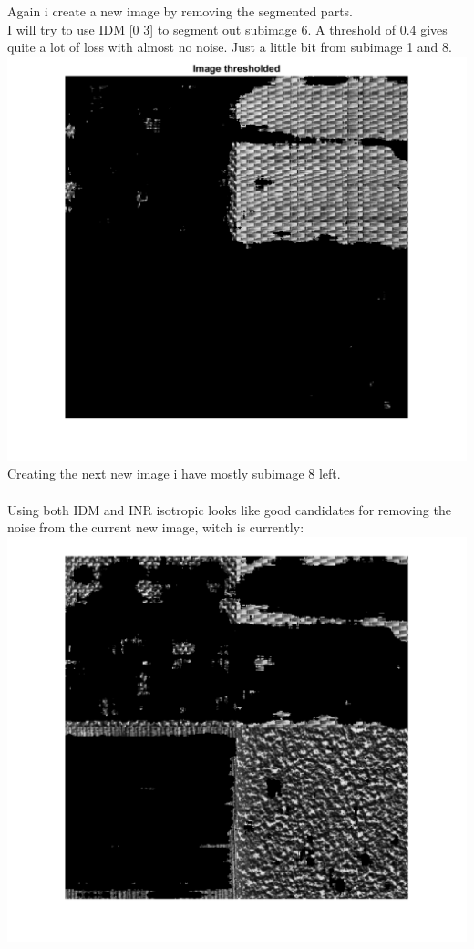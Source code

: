 \documentclass[12pt, letterpaper, twoside]{article}
\begin{document}
Again i create a new image by removing the segmented parts.
\newpage
\ \\
I will try to use IDM [0 3] to segment out subimage 6. A threshold of 0.4 gives quite a lot of loss with almost no noise. Just a little bit from subimage 1 and 8.\\
\includegraphics[scale=0.7]{"2sub6seg.png"}\\
Creating the next new image i have mostly subimage 8 left.\\
\newpage
\ \\
Using both IDM and INR isotropic looks like good candidates for removing the noise from the current new image, witch is currently:\\
\includegraphics[scale=0.7]{"new_img23.png"}\\
\end{document}
